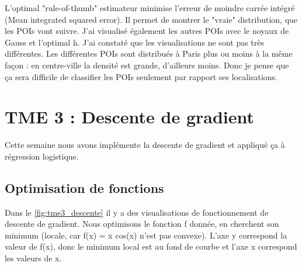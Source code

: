 \documentclass[a4paper,12pt]{article}
\begin{document}
L'optimal "rule-of-thumb" estimateur minimise l'erreur de moindre carrée intégré (Mean integrated squared error).
Il permet de montrer le "vraie" distribution, que les POIs vont suivre.
J'ai visualisé également les autres POIs avec le noyaux de Gauss et l'optimal h.
J'ai constaté que les visualisations ne sont pas très différentes.
Les différentes POIs sont distribués à Paris plus ou moins à la même façon :
en centre-ville la densité est grande, d'ailleurs moins.
Donc je pense que ça sera difficile de classifier les POIs seulement par rapport ses localisations.

\section{TME 3 : Descente de gradient}

Cette semaine nous avons implémente la descente de gradient et appliqué ça à régression logistique.

\subsection{Optimisation de fonctions}

Dans le \autoref{fig:tme3_descente} il y a des visualisations de fonctionnement de descente de gradient.
Nous optimisons le fonction f donnée, en cherchent son minimum (locale, car f(x) = x cos(x) n'est pas convexe).
L'axe y correspond la valeur de f(x), donc le minimum local est au fond de courbe et l'axe x correspond les valeurs de x.
\end{document}

